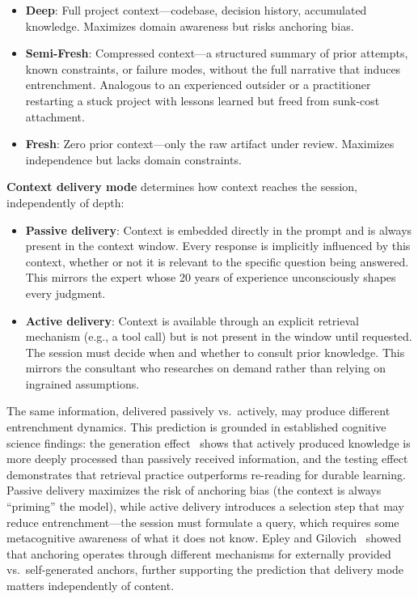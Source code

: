 \documentclass[11pt]{article}
\begin{document}
\begin{itemize}[leftmargin=1.5em]
  \item \textbf{Deep}: Full project context---codebase, decision history, accumulated knowledge. Maximizes domain awareness but risks anchoring bias.
  \item \textbf{Semi-Fresh}: Compressed context---a structured summary of prior attempts, known constraints, or failure modes, without the full narrative that induces entrenchment. Analogous to an experienced outsider or a practitioner restarting a stuck project with lessons learned but freed from sunk-cost attachment.
  \item \textbf{Fresh}: Zero prior context---only the raw artifact under review. Maximizes independence but lacks domain constraints.
\end{itemize}

\textbf{Context delivery mode} determines how context reaches the session, independently of depth:

\begin{itemize}[leftmargin=1.5em]
  \item \textbf{Passive delivery}: Context is embedded directly in the prompt and is always present in the context window. Every response is implicitly influenced by this context, whether or not it is relevant to the specific question being answered. This mirrors the expert whose 20 years of experience unconsciously shapes every judgment.
  \item \textbf{Active delivery}: Context is available through an explicit retrieval mechanism (e.g., a tool call) but is not present in the window until requested. The session must decide when and whether to consult prior knowledge. This mirrors the consultant who researches on demand rather than relying on ingrained assumptions.
\end{itemize}

The same information, delivered passively vs.\ actively, may produce different entrenchment dynamics. This prediction is grounded in established cognitive science findings: the generation effect~\citep{slamecka1978generation} shows that actively produced knowledge is more deeply processed than passively received information, and the testing effect~\citep{roediger2006test} demonstrates that retrieval practice outperforms re-reading for durable learning. Passive delivery maximizes the risk of anchoring bias (the context is always ``priming'' the model), while active delivery introduces a selection step that may reduce entrenchment---the session must formulate a query, which requires some metacognitive awareness of what it does not know. Epley and Gilovich~\citep{epley2006anchoring} showed that anchoring operates through different mechanisms for externally provided vs.\ self-generated anchors, further supporting the prediction that delivery mode matters independently of content.
\end{document}
